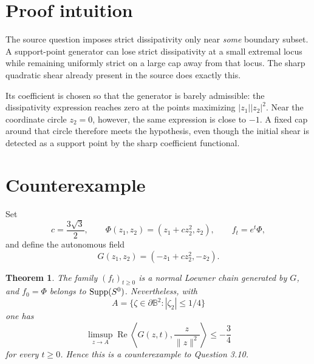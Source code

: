 \documentclass[11pt]{article}
\newtheorem{theorem}{Theorem}
\newcommand{\B}{\mathbb B}
\newcommand{\Supp}{\mathop{\rm Supp}}
\begin{document}
\section{Proof intuition}

The source question imposes strict dissipativity only near \emph{some}
boundary subset.  A support-point generator can lose strict dissipativity at
a small extremal locus while remaining uniformly strict on a large cap away
from that locus.  The sharp quadratic shear already present in the source
does exactly this.

Its coefficient is chosen so that the generator is barely admissible: the
dissipativity expression reaches zero at the points maximizing
$|z_1||z_2|^2$.  Near the coordinate circle $z_2=0$, however, the same
expression is close to $-1$.  A fixed cap around that circle therefore meets
the hypothesis, even though the initial shear is detected as a support point
by the sharp coefficient functional.

\section{Counterexample}

Set
\[
 c=\frac{3\sqrt3}{2},\qquad
 \Phi(z_1,z_2)=(z_1+c z_2^2,z_2),\qquad
 f_t=e^t\Phi,
\]
and define the autonomous field
\begin{equation}\label{eq:G}
 G(z_1,z_2)=(-z_1+c z_2^2,-z_2).
\end{equation}

\begin{theorem}
The family $(f_t)_{t\ge0}$ is a normal Loewner chain generated by $G$,
and $f_0=\Phi$ belongs to $\Supp(S^0)$.  Nevertheless, with
\[
 A=\{\zeta\in\partial\B^2:|\zeta_2|\le1/4\}
\]
one has
\[
 \limsup_{z\to A}\operatorname{Re}\left\langle
 G(z,t),\frac{z}{\|z\|^2}\right\rangle\le-\frac34
\]
for every $t\ge0$.  Hence this is a counterexample to Question 3.10.
\end{theorem}
\end{document}
